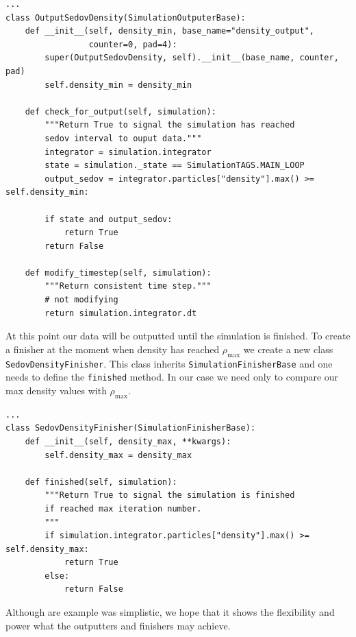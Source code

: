 \begin{lstlisting}
...
class OutputSedovDensity(SimulationOutputerBase):
    def __init__(self, density_min, base_name="density_output",
                 counter=0, pad=4):
        super(OutputSedovDensity, self).__init__(base_name, counter, pad)
        self.density_min = density_min 

    def check_for_output(self, simulation):
        """Return True to signal the simulation has reached
        sedov interval to ouput data."""
        integrator = simulation.integrator
        state = simulation._state == SimulationTAGS.MAIN_LOOP
        output_sedov = integrator.particles["density"].max() >= self.density_min:

        if state and output_sedov:
            return True
        return False

    def modify_timestep(self, simulation):
        """Return consistent time step."""
        # not modifying
        return simulation.integrator.dt

\end{lstlisting}
At this point our data will be outputted until the simulation is finished. To
create a finisher at the moment when density has reached $\rho_{\mathrm{max}}$
we create a new class \lstinline{SedovDensityFinisher}. This class inherits
\lstinline{SimulationFinisherBase} and one needs to define the \lstinline{finished}
method. In our case we need only to compare our max density values with
$\rho_{\mathrm{max}}$.
\begin{lstlisting}
...
class SedovDensityFinisher(SimulationFinisherBase):
    def __init__(self, density_max, **kwargs):
        self.density_max = density_max

    def finished(self, simulation):
        """Return True to signal the simulation is finished
        if reached max iteration number.
        """
        if simulation.integrator.particles["density"].max() >= self.density_max:
            return True
        else:
            return False

\end{lstlisting}

Although are example was simplistic, we hope that it shows the flexibility and power
what the outputters and finishers may achieve.  

